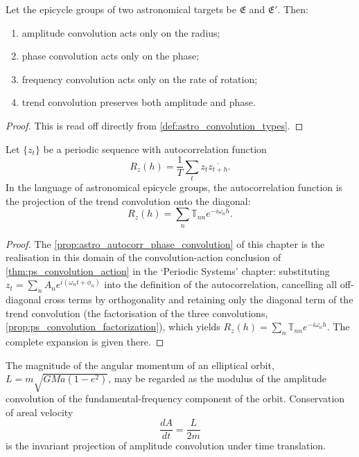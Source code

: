 \begin{theorem}\label{thm:astro_convolution_action}
Let the epicycle groups of two astronomical targets be \(\mathfrak E\) and \(\mathfrak E'\). Then:
\begin{enumerate}[label=(\roman*)]
    \item amplitude convolution acts only on the radius;
    \item phase convolution acts only on the phase;
    \item frequency convolution acts only on the rate of rotation;
    \item trend convolution preserves both amplitude and phase.
\end{enumerate}
\end{theorem}

\begin{proof}
This is read off directly from \cref{def:astro_convolution_types}.
\end{proof}

\begin{proposition}\label{prop:astro_autocorr_phase_convolution}
Let \(\{z_t\}\) be a periodic sequence with autocorrelation function
\[
R_z(h)=\frac1T\sum_t z_t\overline{z_{t+h}}.
\]
In the language of astronomical epicycle groups, the autocorrelation function is the projection of the trend convolution onto the diagonal:
\[
R_z(h)=\sum_n\mathbb T_{nn}e^{-i\omega_n h}.
\]
\end{proposition}

\begin{proof}
The \cref{prop:astro_autocorr_phase_convolution} of this chapter is the realisation in this domain of the convolution-action conclusion of \cref{thm:ps_convolution_action} in the `Periodic Systems' chapter:
substituting $z_t=\sum_n A_n e^{i(\omega_n t+\phi_n)}$ into the definition of the autocorrelation, cancelling all off-diagonal cross terms by orthogonality and retaining only the diagonal term of the trend convolution
(the factorisation of the three convolutions, \cref{prop:ps_convolution_factorization}), which yields $R_z(h)=\sum_n\mathbb T_{nn}e^{-i\omega_n h}$.
The complete expansion is given there.
\end{proof}

\begin{proposition}\label{prop:astro_angular_momentum_phase}
The magnitude of the angular momentum of an elliptical orbit, \(L=m\sqrt{GMa(1-e^2)}\), may be regarded as the modulus of the amplitude convolution of the fundamental-frequency component of the orbit. Conservation of areal velocity
\[
\frac{dA}{dt}=\frac{L}{2m}
\]
is the invariant projection of amplitude convolution under time translation.
\end{proposition}

